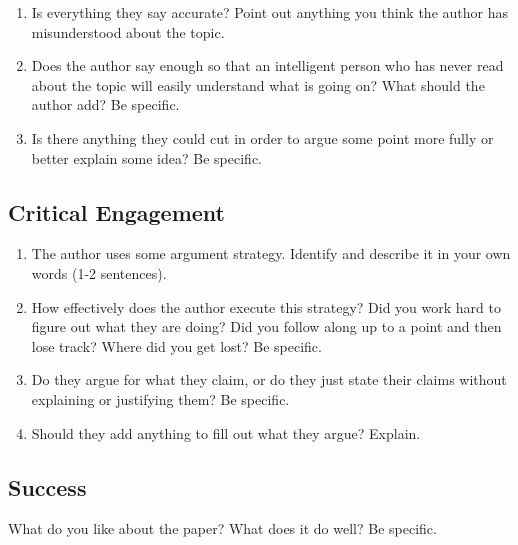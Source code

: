 \documentclass[oneside]{article}
\begin{document}
\begin{enumerate}
\item  Is everything they say accurate?  Point out anything you think the author has misunderstood about the topic. 

\item Does the author say enough so that an intelligent person who has never read about the topic will easily understand what is going on?  What should the author add?  Be specific.

\item  Is there anything they could cut in order to argue some point more fully or better explain some idea?  Be specific.
\end{enumerate}
 
\subsection{Critical Engagement}
\begin{enumerate}
\item  The author uses some argument strategy. Identify and describe it in your own words (1-2 sentences).

\item How effectively does the author execute this strategy?  Did you work hard to figure out what they are doing?  Did you follow along up to a point and then lose track?  Where did you get lost?  Be specific.

\item Do they argue for what they claim, or do they just state their claims without explaining or justifying them?  Be specific. 
 
\item  Should they add anything to fill out what they argue?  Explain.

\end{enumerate}


\subsection{Success} What do you like about the paper?  What does it do well?  Be specific.
\end{document}
